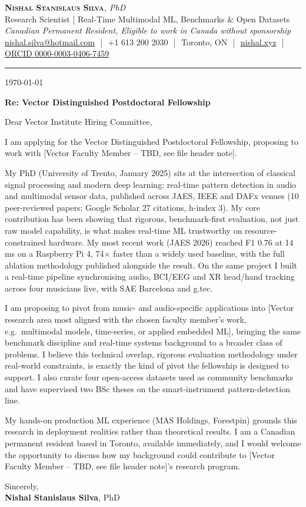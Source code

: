\documentclass[11pt]{article}
\newcommand{\clName}{Nishal Stanislaus Silva}
\newcommand{\clStatus}{Canadian Permanent Resident, Eligible to work in Canada without sponsorship}
\newcommand{\clTagline}{Research Scientist | Real-Time Multimodal ML, Benchmarks \& Open Datasets}
\newcommand{\clFaculty}{[Vector Faculty Member -- TBD, see file header note]}
\begin{document}
\pagestyle{empty}
\begin{center}
    {\LARGE \scshape \textbf{\clName}}{\large \textit{, PhD}}
    \\[1pt]
    {\small \clTagline}
    \\[1pt]
    {\footnotesize\textit{\clStatus}}
    \\[1pt]
    {\small
    \href{mailto:nishal.silva@hotmail.com}{nishal.silva@hotmail.com}
    \,\,|\,\, +1 613 200 2030
    \,\,|\,\, Toronto, ON
    \,\,|\,\, \href{https://nishal.xyz}{nishal.xyz}
    \,\,|\,\, \href{https://orcid.org/0000-0003-0406-7459}{ORCID 0000-0003-0406-7459}}
\end{center}

\rule{\linewidth}{0.4pt}\vspace{0.6em}

\today

\textbf{Re: Vector Distinguished Postdoctoral Fellowship}

Dear Vector Institute Hiring Committee,

I am applying for the Vector Distinguished Postdoctoral Fellowship, proposing to work with \clFaculty{}.

My PhD (University of Trento, January 2025) sits at the intersection of classical signal processing and modern deep learning: real-time pattern detection in audio and multimodal sensor data, published across JAES, IEEE and DAFx venues (10 peer-reviewed papers; Google Scholar 27 citations, h-index 3). My core contribution has been showing that rigorous, benchmark-first evaluation, not just raw model capability, is what makes real-time ML trustworthy on resource-constrained hardware. My most recent work (JAES 2026) reached F1 0.76 at 14 ms on a Raspberry Pi 4, 74$\times$ faster than a widely used baseline, with the full ablation methodology published alongside the result. On the same project I built a real-time pipeline synchronising audio, BCI/EEG and XR head/hand tracking across four musicians live, with SAE Barcelona and g.tec.

I am proposing to pivot from music- and audio-specific applications into [Vector research area most aligned with the chosen faculty member's work, e.g.\ multimodal models, time-series, or applied embedded ML], bringing the same benchmark discipline and real-time systems background to a broader class of problems. I believe this technical overlap, rigorous evaluation methodology under real-world constraints, is exactly the kind of pivot the fellowship is designed to support. I also curate four open-access datasets used as community benchmarks and have supervised two BSc theses on the smart-instrument pattern-detection line.

My hands-on production ML experience (MAS Holdings, Forestpin) grounds this research in deployment realities rather than theoretical results. I am a Canadian permanent resident based in Toronto, available immediately, and I would welcome the opportunity to discuss how my background could contribute to \clFaculty{}'s research program.

\vspace{12pt}
Sincerely,\\[2pt]
\textbf{\clName}, PhD
\end{document}
